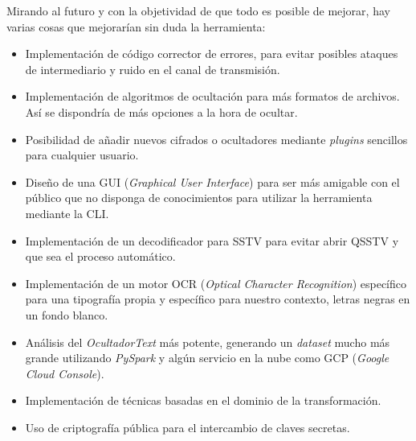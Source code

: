 Mirando al futuro y con la objetividad de que todo es posible de mejorar, hay varias cosas que mejorarían sin duda la herramienta:

\begin{itemize}
    \item Implementación de código corrector de errores, para evitar posibles ataques de intermediario y ruido en el canal de transmisión.
    \item Implementación de algoritmos de ocultación para más formatos de archivos. Así se dispondría de más opciones a la hora de ocultar.
    \item Posibilidad de añadir nuevos cifrados o ocultadores mediante \textit{plugins} sencillos para cualquier usuario.
    \item Diseño de una GUI (\textit{Graphical User Interface}) para ser más amigable con el público que no disponga de conocimientos para utilizar la herramienta mediante la CLI.
    \item Implementación de un decodificador para SSTV para evitar abrir QSSTV y que sea el proceso automático.
    \item Implementación de un motor OCR (\textit{Optical Character Recognition}) específico para una tipografía propia y específico para nuestro contexto, letras negras en un fondo blanco.  
    \item Análisis del \textit{OcultadorText} más potente, generando un \textit{dataset} mucho más grande utilizando \textit{PySpark} y algún servicio en la nube como GCP (\textit{Google Cloud Console}).
    \item Implementación de técnicas basadas en el dominio de la transformación.
    \item Uso de criptografía pública para el intercambio de claves secretas.


    
\end{itemize}



